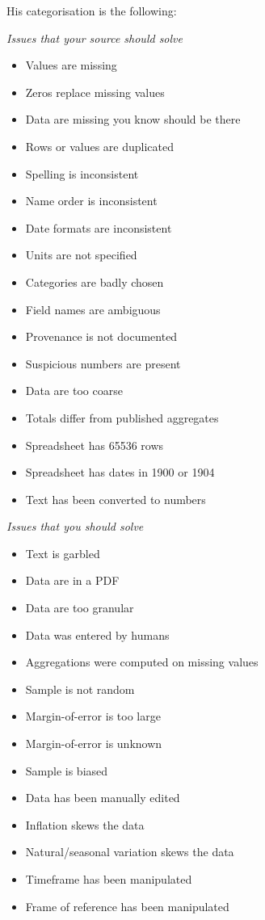 His categorisation is the following:

\emph{Issues that your source should solve}

\begin{itemize}
 \setlength{\parskip}{0pt}
 \setlength{\itemsep}{0pt plus 1pt}
 \item Values are missing
 \item Zeros replace missing values
 \item Data are missing you know should be there
 \item Rows or values are duplicated
 \item Spelling is inconsistent
 \item Name order is inconsistent
 \item Date formats are inconsistent
 \item Units are not specified
 \item Categories are badly chosen
 \item Field names are ambiguous
 \item Provenance is not documented
 \item Suspicious numbers are present
 \item Data are too coarse
 \item Totals differ from published aggregates
 \item Spreadsheet has 65536 rows
 \item Spreadsheet has dates in 1900 or 1904
 \item Text has been converted to numbers
\end{itemize}

\emph{Issues that you should solve}
\begin{itemize}
 \setlength{\parskip}{0pt}
 \setlength{\itemsep}{0pt plus 1pt}
 \item Text is garbled
 \item Data are in a PDF
 \item Data are too granular
 \item Data was entered by humans
 \item Aggregations were computed on missing values
 \item Sample is not random
 \item Margin-of-error is too large
 \item Margin-of-error is unknown
 \item Sample is biased
 \item Data has been manually edited
 \item Inflation skews the data
 \item Natural/seasonal variation skews the data
 \item Timeframe has been manipulated
 \item Frame of reference has been manipulated
\end{itemize}

